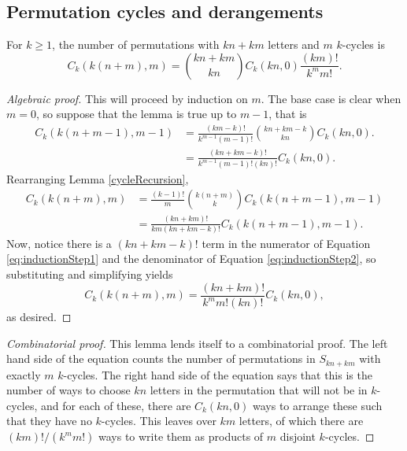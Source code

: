 \subsection{Permutation cycles and derangements}
\begin{lemma}
  \label{CIdentity}
  For $k \geq 1$, the number of permutations with $kn + km$ letters and
  $m$ $k$-cycles is
  \begin{equation}
    C_k(k(n + m), m) = \binom{kn+km}{kn}C_k(kn,0)\frac{(km)!}{k^mm!}.
  \end{equation}
\end{lemma}
\begin{proof}[Algebraic proof]
  This will proceed by induction on $m$. The base case is clear when $m=0$,
  so suppose that the lemma is true up to $m-1$, that is \begin{align}
    C_k(k(n + m - 1), m - 1)
    &=
    \frac{(km-k)!}{k^{m-1}(m-1)!}\binom{kn + km - k}{kn}C_k(kn, 0). \\
    &= \frac{(kn + km - k)!}{k^{m-1}(m-1)!(kn)!}C_k(kn, 0).
    \label{eq:inductionStep1}
  \end{align}
  Rearranging Lemma \ref{cycleRecursion}, \begin{align}
    C_k(k(n + m), m)
    &= \frac{(k-1)!}{m}\binom{k(n + m)}{k}C_k(k(n+m-1), m-1) \\
    &= \frac{(kn+km)!}{km(kn+km-k)!}C_k(k(n+m-1), m-1).
    \label{eq:inductionStep2}
  \end{align}
  Now, notice there is a $(kn + km - k)!$ term in the numerator of Equation \ref{eq:inductionStep1} and
  the denominator of Equation \ref{eq:inductionStep2}, so substituting and simplifying yields \begin{equation}
    C_k(k(n + m), m)
    = \frac{(kn+km)!}{k^m m!(kn)!}C_k(kn, 0),
  \end{equation}
  as desired.
\end{proof}
\begin{proof}[Combinatorial proof]
  This lemma lends itself to a combinatorial proof.
  The left hand side of the equation counts the number of permutations in
  $S_{kn+km}$ with exactly $m$ $k$-cycles.
  The right hand side of the equation says that this is the number of ways to
  choose $kn$ letters in the permutation that will not be in $k$-cycles,
  and for each of these, there are $C_k(kn,0)$ ways to arrange these such that
  they have no $k$-cycles.
  This leaves over $km$ letters, of which there are
  $(km)!/(k^mm!)$ ways to write them as products of $m$
  disjoint $k$-cycles.
\end{proof}
